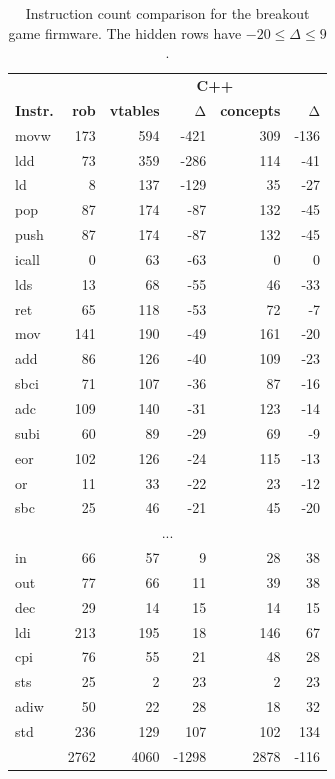 \documentclass[10pt,sigplan,screen,anonymous]{acmart}
\begin{document}
\begin{table}[bp]
\caption{Instruction count comparison for the breakout game firmware. The hidden rows have $-20 \le \Delta \le 9$.}\vspace{-8pt}
\label{tb:mnemonicscount}
\begin{tabular}{lrrrrr}
\toprule
& & \multicolumn{4}{c}{\bf C++} \\
\cmidrule{3-6}
\bf Instr. & \bf rob & \bf vtables & Δ & \bf concepts & Δ \\
\midrule
movw & 173 & 594 & -421 & 309 & -136 \\
ldd & 73 & 359 & -286 & 114 & -41 \\
ld & 8 & 137 & -129 & 35 & -27 \\
pop & 87 & 174 & -87 & 132 & -45 \\
push & 87 & 174 & -87 & 132 & -45 \\
icall & 0 & 63 & -63 & 0 & 0 \\
lds & 13 & 68 & -55 & 46 & -33 \\
ret & 65 & 118 & -53 & 72 & -7 \\
mov & 141 & 190 & -49 & 161 & -20 \\
add & 86 & 126 & -40 & 109 & -23 \\
sbci & 71 & 107 & -36 & 87 & -16 \\
adc & 109 & 140 & -31 & 123 & -14 \\
subi & 60 & 89 & -29 & 69 & -9 \\
eor & 102 & 126 & -24 & 115 & -13 \\
or & 11 & 33 & -22 & 23 & -12 \\
sbc & 25 & 46 & -21 & 45 & -20 \\
\multicolumn{6}{c}{...} \\
in & 66 & 57 & 9 & 28 & 38 \\
out & 77 & 66 & 11 & 39 & 38 \\
dec & 29 & 14 & 15 & 14 & 15 \\
ldi & 213 & 195 & 18 & 146 & 67 \\
cpi & 76 & 55 & 21 & 48 & 28 \\
sts & 25 & 2 & 23 & 2 & 23 \\
adiw & 50 & 22 & 28 & 18 & 32 \\
std & 236 & 129 & 107 & 102 & 134 \\
\midrule
 & 2762 & 4060 & -1298 & 2878 & -116 \\
\bottomrule
\end{tabular}
\end{table}
\end{document}
